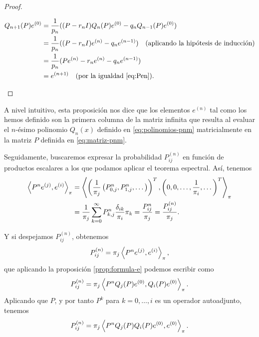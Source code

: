 \begin{proof}
\begin{itemize}
            \begin{equation*}
                \begin{split}
                    Q_{n+1}(P)e^{(0)} &= \dfrac{1}{p_n}((P-r_n I)Q_n(P)e^{(0)}-q_n Q_{n-1}(P)e^{(0)}) \\
                    &= \dfrac{1}{p_n}((P-r_n I)e^{(n)}-q_n e^{(n-1)}) \ \  \ \text{(aplicando la hipótesis de inducción)} \\
                    &= \dfrac{1}{p_n}(Pe^{(n)} -r_n e^{(n)}-q_n e^{(n-1)}) \\
                    &= e^{(n+1)} \ \ \ \text{(por la igualdad \eqref{eq:Pen})}.
                \end{split}
            \end{equation*}
        \end{itemize}
    \end{proof}

    A nivel intuitivo, esta proposición nos dice que los elementos $e^{(n)}$ tal como los hemos definido son la primera columna de la matriz infinita que resulta al evaluar el $n$-ésimo polinomio $Q_n(x)$ definido en \eqref{eq:polinomios-pnm} matricialmente en la matriz $P$ definida en \eqref{eq:matriz-pnm}.

    Seguidamente, buscaremos expresar la probabilidad $P_{ij}^{(n)}$ en función de productos escalares a los que podamos aplicar el teorema espectral. Así, tenemos
    \begin{equation*}
        \begin{split}
            \left\langle P^n e^{(j)} , e^{(i)} \right\rangle_\pi &= \left\langle \left(\dfrac{1}{\pi_j}\left(P^n_{0,j},P^n_{1,j},\dots\right)\right)^T , \left(0,0,\dots, \dfrac{1}{\pi_i},\dots \right)^T \right\rangle_\pi \\
            &= \dfrac{1}{\pi_j} \sum_{k=0}^\infty P^n_{k,j} \dfrac{\delta_{ik}}{\pi_i}\pi_k = \dfrac{P^n_{ij}}{\pi_j}=\dfrac{P^{(n)}_{ij}}{\pi_j}.
        \end{split}
    \end{equation*}

    Y si despejamos $P^{(n)}_{ij}$, obtenemos
    \begin{equation*}
        P^{(n)}_{ij} = \pi_j \left\langle P^n e^{(j)} , e^{(i)} \right\rangle_\pi,
    \end{equation*}
    que aplicando la proposición \ref{prop:formula-e} podemos escribir como
    \begin{equation*}
        P^{(n)}_{ij} = \pi_j \left\langle P^n Q_j(P)e^{(0)} , Q_{i}(P)e^{(0)} \right\rangle_\pi.
    \end{equation*}
    Aplicando que $P$, y por tanto $P^k$ para $k=0,\dots,i$ es un operador autoadjunto, tenemos
    \begin{equation*}
        P^{(n)}_{ij} = \pi_j \left\langle P^n Q_j(P)Q_{i}(P)e^{(0)} , e^{(0)} \right\rangle_\pi.
    \end{equation*}

